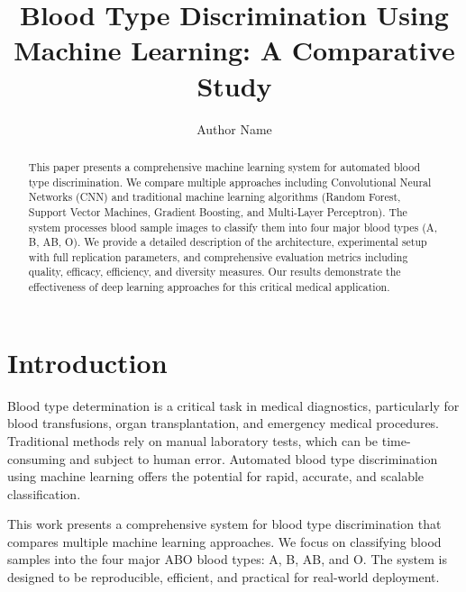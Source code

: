 \documentclass[runningheads]{llncs}
\begin{document}
\title{Blood Type Discrimination Using Machine Learning: A Comparative Study}

\author{Author Name}



\maketitle

\begin{abstract}
This paper presents a comprehensive machine learning system for automated blood type discrimination. We compare multiple approaches including Convolutional Neural Networks (CNN) and traditional machine learning algorithms (Random Forest, Support Vector Machines, Gradient Boosting, and Multi-Layer Perceptron). The system processes blood sample images to classify them into four major blood types (A, B, AB, O). We provide a detailed description of the architecture, experimental setup with full replication parameters, and comprehensive evaluation metrics including quality, efficacy, efficiency, and diversity measures. Our results demonstrate the effectiveness of deep learning approaches for this critical medical application.

\end{abstract}

\section{Introduction}

Blood type determination is a critical task in medical diagnostics, particularly for blood transfusions, organ transplantation, and emergency medical procedures. Traditional methods rely on manual laboratory tests, which can be time-consuming and subject to human error. Automated blood type discrimination using machine learning offers the potential for rapid, accurate, and scalable classification.

This work presents a comprehensive system for blood type discrimination that compares multiple machine learning approaches. We focus on classifying blood samples into the four major ABO blood types: A, B, AB, and O. The system is designed to be reproducible, efficient, and practical for real-world deployment.
\end{document}
